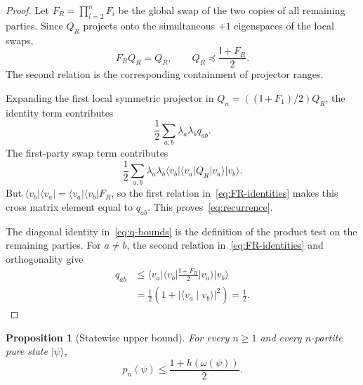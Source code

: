 \documentclass[11pt]{article}
\newtheorem{proposition}[theorem]{Proposition}
\theoremstyle{definition}
\theoremstyle{remark}
\newcommand{\id}{\mathsf{I}}
\newcommand{\ket}[1]{\lvert #1\rangle}
\newcommand{\bra}[1]{\langle #1\rvert}
\newcommand{\braket}[2]{\langle #1\mid #2\rangle}
\begin{document}
\begin{proof}
Let $F_R=\prod_{i=2}^nF_i$ be the global swap of the two copies of all
remaining parties.  Since $Q_R$ projects onto the simultaneous $+1$
eigenspaces of the local swaps,
\begin{equation}\label{eq:FR-identities}
  F_RQ_R=Q_R,
  \qquad
  Q_R\preceq\frac{\id+F_R}{2}.
\end{equation}
The second relation is the corresponding containment of projector ranges.

Expanding the first local symmetric projector in
$Q_n=((\id+F_1)/2)Q_R$, the identity term contributes
\[
  \frac12\sum_{a,b}\lambda_a\lambda_b q_{ab}.
\]
The first-party swap term contributes
\[
  \frac12\sum_{a,b}\lambda_a\lambda_b
  \bra{v_b}\bra{v_a}Q_R\ket{v_a}\ket{v_b}.
\]
But $\bra{v_b}\bra{v_a}=\bra{v_a}\bra{v_b}F_R$, so the first relation
in~\eqref{eq:FR-identities} makes this cross matrix element equal to
$q_{ab}$.  This proves~\eqref{eq:recurrence}.

The diagonal identity in~\eqref{eq:q-bounds} is the definition of the
product test on the remaining parties.  For $a\neq b$, the second relation
in~\eqref{eq:FR-identities} and orthogonality give
\begin{align*}
  q_{ab}
  &\leq
  \bra{v_a}\bra{v_b}\frac{\id+F_R}{2}
      \ket{v_a}\ket{v_b} \\
  &=\frac12\left(1+|\braket{v_a}{v_b}|^2\right)
   =\frac12.
\end{align*}
\end{proof}

\begin{proposition}[Statewise upper bound]\label{prop:upper}
For every $n\geq1$ and every $n$-partite pure state $\ket\psi$,
\begin{equation}\label{eq:statewise-h}
  p_n(\psi)\leq\frac{1+h(\omega(\psi))}{2}.
\end{equation}
\end{proposition}
\end{document}
